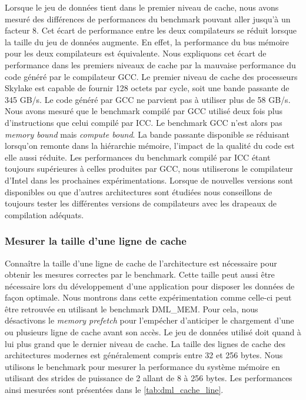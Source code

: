         Lorsque le jeu de données tient dans le premier niveau de cache, nous avons mesuré des différences de performances du benchmark pouvant aller jusqu'à un facteur 8. Cet écart de performance entre les deux compilateurs se réduit lorsque la taille du jeu de données augmente. En effet, la performance du bus mémoire pour les deux compilateurs est équivalente. Nous expliquons cet écart de performance dans les premiers niveaux de cache par la mauvaise performance du code généré par le compilateur GCC. Le premier niveau de cache des processeurs Skylake est capable de fournir 128 octets par cycle, soit une bande passante de 345 GB/s. Le code généré par GCC ne parvient pas à utiliser plus de 58 GB/s. Nous avons mesuré que le benchmark compilé par GCC utilisé deux fois plus d'instructions que celui compilé par ICC. Le benchmark GCC n'est alors pas \textit{memory bound} mais \textit{compute bound}. La bande passante disponible se réduisant lorsqu'on remonte dans la hiérarchie mémoire, l'impact de la qualité du code est elle aussi réduite. Les performances du benchmark compilé par ICC étant toujours supérieures à celles produites par GCC, nous utiliserons le compilateur d'Intel dans les prochaines expérimentations. Lorsque de nouvelles versions sont disponibles ou que d'autres architectures sont étudiées nous conseillons de toujours tester les différentes versions de compilateurs avec les drapeaux de compilation adéquats.
    
    
    
    \subsubsection{Mesurer la taille d'une ligne de cache}
        Connaître la taille d'une ligne de cache de l'architecture est nécessaire pour obtenir les mesures correctes par le benchmark. Cette taille peut aussi être nécessaire lors du développement d'une application pour disposer les données de façon optimale. Nous montrons dans cette expérimentation comme celle-ci peut être retrouvée en utilisant le benchmark DML\_MEM. Pour cela, nous désactivons le \textit{memory prefetch} pour l'empécher d'anticiper le chargement d'une ou plusieurs ligne de cache avant son accès. Le jeu de données utilisé doit quand à lui plus grand que le dernier niveau de cache. La taille des lignes de cache des architectures modernes est généralement compris entre 32 et 256 bytes. Nous utilisons le benchmark pour mesurer la performance du système mémoire en utilisant des strides de puissance de 2 allant de 8 à 256 bytes. Les performances ainsi mesurées sont présentées dans le \autoref{tab:dml_cache_line}.
    
